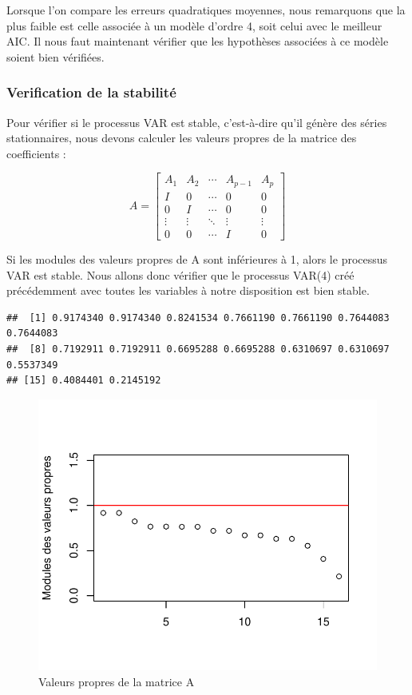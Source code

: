 \documentclass[11pt,]{article}
\begin{document}
Lorsque l'on compare les erreurs quadratiques moyennes, nous remarquons
que la plus faible est celle associée à un modèle d'ordre 4, soit celui
avec le meilleur AIC. Il nous faut maintenant vérifier que les
hypothèses associées à ce modèle soient bien vérifiées.

\subsubsection{Verification de la
stabilité}\label{verification-de-la-stabilite}

Pour vérifier si le processus VAR est stable, c'est-à-dire qu'il génère
des séries stationnaires, nous devons calculer les valeurs propres de la
matrice des coefficients :

\[A = \begin{bmatrix}
A_1 & A_2 & \cdots & A_{p-1} & A_p \\
I & 0 & \cdots & 0 & 0 \\
0 & I & \cdots & 0 & 0 \\
\vdots & \vdots & \ddots & \vdots & \vdots \\
0 & 0 & \cdots & I & 0 
\end{bmatrix}\]

Si les modules des valeurs propres de A sont inférieures à 1, alors le
processus VAR est stable. Nous allons donc vérifier que le processus
VAR(4) créé précédemment avec toutes les variables à notre disposition
est bien stable.

\begin{verbatim}
##  [1] 0.9174340 0.9174340 0.8241534 0.7661190 0.7661190 0.7644083 0.7644083
##  [8] 0.7192911 0.7192911 0.6695288 0.6695288 0.6310697 0.6310697 0.5537349
## [15] 0.4084401 0.2145192
\end{verbatim}

\begin{figure}[htbp]
\centering
\includegraphics{doc_files/figure-latex/unnamed-chunk-38-1.pdf}
\caption{\label{fig24} Valeurs propres de la matrice A}
\end{figure}
\end{document}
